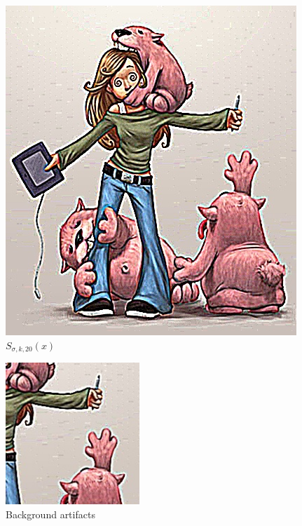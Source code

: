 \documentclass[10pt,twocolumn]{article}
\begin{document}
\begin{figure}
\begin{minipage}{0.15\textwidth}
\caption{$S_{\sigma, k, 10}(x)$}
\end{minipage}
\begin{minipage}{0.15\textwidth}
\centering \includegraphics[width=\textwidth]{sharp20.jpg}
\caption{ $S_{\sigma, k, 20}(x)$ }
\end{minipage}
\end{figure}

\begin{figure}
\centering
\includegraphics[width=0.45\textwidth]{sharpcrop.jpg}
\caption{Background artifacts}
\end{figure}
\end{document}
